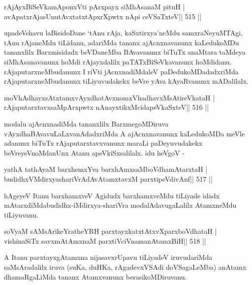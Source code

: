 \begin{shl}
rAjAyxBiSeVkamAponxVti pArxpayx siMhAsanaM pituH |
avApatxrAjasUnutAvxtatxtApxrXpwtx nApi ceVSaTxteV\hfill || 515 ||
\end{shl}

\begin{artha}
upadeVshavu laBisidoDane `tAnu rAja, kaSxtirxya'neMdu samxraNeyuMTAgi,
tAnu rAjaneMdu tiLidanu, adariMda tananx ajAcnxnavanunx kaLedukoMDu
tananxlilx Barxmisidadx beVDaneMba BAvavanunx biTuTx anaMtara taMdeya
siMhAsanavanunx hoMdi rAjayxdalilx paTATxBiSeVkavanunx
hoMdidanu. rAjaputarxneMbudanunx I riVti jAcnxnadiMdaleV
paDedukoMDadadxriMda rAjaputarxneMbudanunx tiLiyuvudakekx
beVre yAva kAyaRvanunx mADalilalx.
\end{artha}

\begin{shl}
moVhAdhayxsAtxtamxvAyxdhatAvxnomxVhadhavxMsAtireVkataH |
rAjaputarxtavxsaMpArxpwtx nAnayxtikxMcidapeVkaSxteV\hfill || 516 ||
\end{shl}

\begin{artha}
modalu ajAcnxnadiMda tananxlilx BarxmegoMDiruva
vAyxdhaBAvavuLaLxvanAdadxriMda A ajAcnxnavanunx kaLedukoMDa meVle
adanunx biTuTx rAjaputarxtavxvanunx maraLi paDeyuvudakekx
beVreyeVnoMdanUnx Atanu apeVkiSxsalilalx. idu heVgoV -
\end{artha}

\begin{shl}
yathA tathA\s yaM barxhemxYva barxhAmxsaMboVdhamAtarxtaH |
budidhxVMdirxyashariVrAdAvAtamxtavxM parxtipeVdivAnf\hfill || 517 ||
\end{shl}

\begin{artha}
hAgeyeV Itanu barxhamxveV Agidudx barxhamxveMdu tiLiyade
idadx mAtarxdiMda\break budidhx-iMdirxya-shariVra modalAdavugaLalilx
AtamxneMdu tiLiyuvanu.
\end{artha}


\begin{shl}
soV\s yaM sAMsArikeYratheYRH parxtayxkatxtAtxvXparxboVdhataH |
vishinaSiTx savxmAtAmxnaM parxtiVciVnamanAtamxBiH\hfill || 518 ||
\end{shl}

\begin{artha}
A Itanu parxtayxgAtamxna nijasavxrUpavu tiLiyadeV iruvudariMda saMsAradalilx iruva (suKa, duHKa, rAgadevxVSAdi doVSagaLeMba) anAtamx dhamaRgaLiMda tananx Atamxvanunx berasikoMDiruvanu.
\end{artha}

